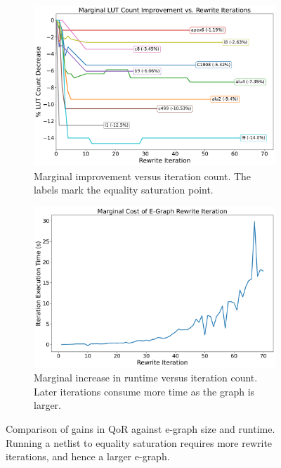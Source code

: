 \begin{figure}
    \begin{subfigure}{0.47\textwidth}
        \centering
        \includegraphics[width=\textwidth]{img/improvement.pdf}
        \caption{Marginal improvement versus iteration count. The labels mark the equality saturation point.}\label{fig:marginal:improvement}
    \end{subfigure}
    \hfill\vspace{4mm}
    \begin{subfigure}{0.47\textwidth}
        \centering
        \includegraphics[width=\textwidth]{img/runtime_derivative.pdf}
        \caption{Marginal increase in runtime versus iteration count. Later iterations consume more time as the graph is larger.}\label{fig:marginal:runtime}
    \end{subfigure}
    \caption{Comparison of gains in QoR against e-graph size and runtime. Running a netlist to equality saturation requires more rewrite iterations, and hence a larger e-graph.}\label{fig:marginal}
\end{figure}


